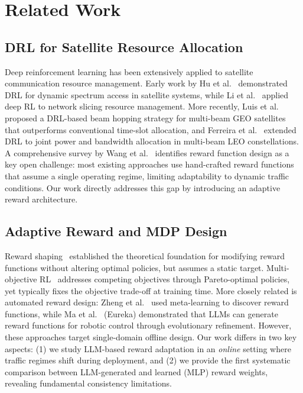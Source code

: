 \documentclass[conference]{IEEEtran}
\begin{document}
\section{Related Work}

\subsection{DRL for Satellite Resource Allocation}
Deep reinforcement learning has been extensively applied to satellite communication resource management. Early work by Hu et al.~\cite{drl_satcom1} demonstrated DRL for dynamic spectrum access in satellite systems, while Li et al.~\cite{drl_resource} applied deep RL to network slicing resource management. More recently, Luis et al.~\cite{luis2019drl_beam} proposed a DRL-based beam hopping strategy for multi-beam GEO satellites that outperforms conventional time-slot allocation, and Ferreira et al.~\cite{ferreira2023multibeam} extended DRL to joint power and bandwidth allocation in multi-beam LEO constellations. A comprehensive survey by Wang et al.~\cite{wang2023drl_satcom_survey} identifies reward function design as a key open challenge: most existing approaches use hand-crafted reward functions that assume a single operating regime, limiting adaptability to dynamic traffic conditions. Our work directly addresses this gap by introducing an adaptive reward architecture.

\subsection{Adaptive Reward and MDP Design}
Reward shaping~\cite{ng1999reward_shaping} established the theoretical foundation for modifying reward functions without altering optimal policies, but assumes a static target. Multi-objective RL~\cite{hayes2022morl_survey} addresses competing objectives through Pareto-optimal policies, yet typically fixes the objective trade-off at training time. More closely related is automated reward design: Zheng et al.~\cite{zheng2020reward_design} used meta-learning to discover reward functions, while Ma et al.~\cite{ma2023eureka} (Eureka) demonstrated that LLMs can generate reward functions for robotic control through evolutionary refinement. However, these approaches target single-domain offline design. Our work differs in two key aspects: (1) we study LLM-based reward adaptation in an \emph{online} setting where traffic regimes shift during deployment, and (2) we provide the first systematic comparison between LLM-generated and learned (MLP) reward weights, revealing fundamental consistency limitations.
\end{document}
